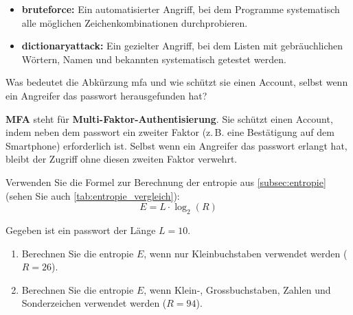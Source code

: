 \documentclass[12pt,a4paper]{article}
\newcounter{subsubsubsection}[subsubsection]
\begin{document}
\begin{solutionbox}[Musterlösung 2.3.1.1.1]
\begin{itemize}
    \item \textbf{\gls{bruteforce}:} Ein automatisierter Angriff, bei dem Programme \mbox{systematisch} alle möglichen Zeichenkombinationen durchprobieren.
    \item \textbf{\gls{dictionaryattack}:} Ein gezielter Angriff, bei dem Listen mit gebräuchlichen Wörtern, Namen und bekannten  \mbox{systematisch} getestet werden.
\end{itemize}
\end{solutionbox}

\begin{taskbox}
Was bedeutet die Abkürzung \gls{mfa} und wie schützt sie einen Account, selbst wenn ein Angreifer das \gls{passwort} herausgefunden hat?
\end{taskbox}

\begin{solutionbox}[Musterlösung 2.3.1.1.2]
\textbf{MFA} steht für \textbf{Multi-Faktor-Authentisierung}. Sie schützt einen Account, indem neben dem \gls{passwort} ein zweiter Faktor (z.\,B. eine Bestätigung auf dem Smartphone) erforderlich ist. Selbst wenn ein Angreifer das \gls{passwort} erlangt hat, bleibt der Zugriff ohne diesen zweiten Faktor verwehrt.
\end{solutionbox}

\newpage


Verwenden Sie die Formel zur Berechnung der \gls{entropie} aus \cref{subsec:entropie} \newline(sehen Sie auch \cref{tab:entropie_vergleich}):
\[
E = L \cdot \log_2(R)
\]

\begin{taskbox}
Gegeben ist ein \gls{passwort} der Länge $L = 10$.
\begin{enumerate}[label=\alph*)]
    \item Berechnen Sie die \gls{entropie} $E$, wenn nur Kleinbuchstaben verwendet werden \newline($R = 26$).
    \item Berechnen Sie die \gls{entropie} $E$, wenn Klein-, Grossbuchstaben, Zahlen und Sonderzeichen verwendet werden ($R = 94$).
\end{enumerate}
\end{taskbox}
\end{document}
